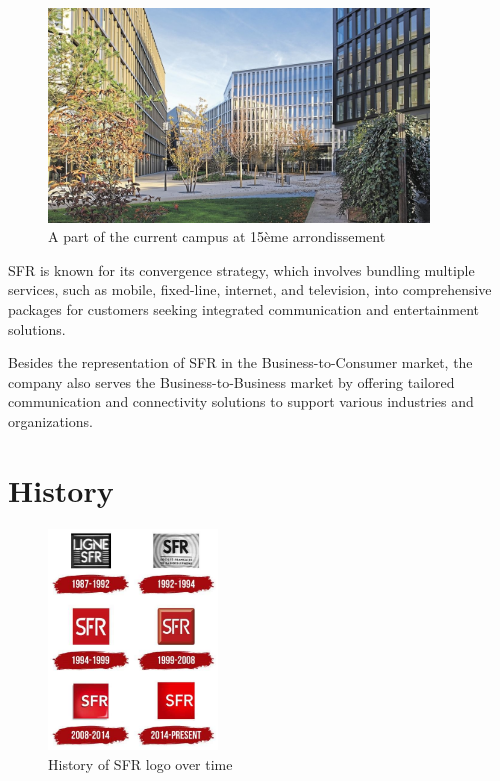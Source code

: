 \begin{figure}[H]
    \centering
    \includegraphics[width=0.9\textwidth]{images/altice-campus.jpg}
    \caption{A part of the current campus at 15ème arrondissement}
    \label{fig:altice_campus}
\end{figure}

SFR is known for its convergence strategy, which involves bundling multiple services, such as mobile, fixed-line, internet, and television, into comprehensive packages for customers seeking integrated communication and entertainment solutions.

Besides the representation of SFR in the Business-to-Consumer market, the company also serves the Business-to-Business market by offering tailored communication and connectivity solutions to support various industries and organizations.

\section{History}

\begin{figure}[H]
    \centering
    \includegraphics[width=0.4\textwidth]{images/SFR-Logo-History.jpg} %
    \caption{History of SFR logo over time}
    \label{fig:sfr_logo}
\end{figure}

